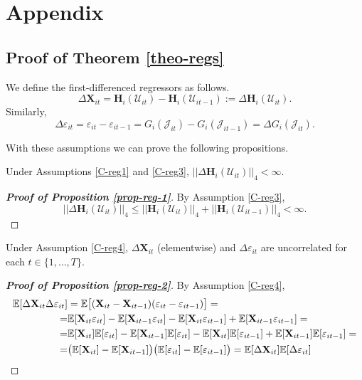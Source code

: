 \section{Appendix}\label{sec-appendix}

\subsection{Proof of Theorem \ref{theo-regs}}\label{subsec-appendix-estimators}

We define the first-differenced regressors as follows.
\[ \Delta \mathbf{X}_{it} =\mathbf{H}_i(\mathcal{U}_{it}) - \mathbf{H}_i(\mathcal{U}_{it-1}) := \Delta \mathbf{H}_i(\mathcal{U}_{it}). \]
Similarly, 
\[\Delta \varepsilon_{it} = \varepsilon_{it} - \varepsilon_{it-1} = G_i(\mathcal{J}_{it}) - G_i(\mathcal{J}_{it-1}) = \Delta G_i(\mathcal{J}_{it}).
\]
 
With these assumptions we can prove the following propositions.
\begin{prop}\label{prop-reg-1}
Under Assumptions \ref{C-reg1} and \ref{C-reg3}, $|| \Delta \mathbf{H}_i(\mathcal{U}_{it})||_4 < \infty$.
\end{prop}

\begin{proof}[\textnormal{\textbf{Proof of Proposition \ref{prop-reg-1}}}]
By Assumption \ref{C-reg3},
\[
 || \Delta \mathbf{H}_i(\mathcal{U}_{it})||_4 \leq  ||\mathbf{H}_i(\mathcal{U}_{it})||_4 +  || \mathbf{H}_i(\mathcal{U}_{it-1})||_4 < \infty.
\]
\end{proof} 

\begin{prop}\label{prop-reg-2}
Under Assumption \ref{C-reg4}, $\Delta \mathbf{X}_{it}$ (elementwise) and $\Delta \varepsilon_{it}$ are uncorrelated for each $t\in \{1, \ldots, T\}$.
\end{prop}

\begin{proof}[\textnormal{\textbf{Proof of Proposition \ref{prop-reg-2}}}]
By Assumption \ref{C-reg4},
\begin{align*}
\mathbb{E} [\Delta \mathbf{X}_{it}\Delta \varepsilon_{it}] &= \mathbb{E} \big[(\mathbf{X}_{it} - \mathbf{X}_{it-1}) (\varepsilon_{it} - \varepsilon_{it-1})\big] =\\
=&\mathbb{E}[\mathbf{X}_{it}  \varepsilon_{it}] - \mathbb{E}[\mathbf{X}_{it-1}  \varepsilon_{it}]- \mathbb{E}[\mathbf{X}_{it}  \varepsilon_{it-1}] + \mathbb{E}[\mathbf{X}_{it-1}  \varepsilon_{it-1}] =\\
=& \mathbb{E}[\mathbf{X}_{it}]\mathbb{E}[  \varepsilon_{it}] - \mathbb{E}[\mathbf{X}_{it-1}]\mathbb{E}[  \varepsilon_{it}]- \mathbb{E}[\mathbf{X}_{it}]\mathbb{E}[  \varepsilon_{it-1}] + \mathbb{E}[\mathbf{X}_{it-1}]\mathbb{E}[  \varepsilon_{it-1}] =\\
=& \big( \mathbb{E}[\mathbf{X}_{it}] - \mathbb{E}[\mathbf{X}_{it-1}]\big)\big(\mathbb{E}[  \varepsilon_{it}]  - \mathbb{E}[\varepsilon_{it-1}]\big) = \mathbb{E} [\Delta \mathbf{X}_{it}]\mathbb{E}[\Delta \varepsilon_{it}]
\end{align*}
\end{proof} 


